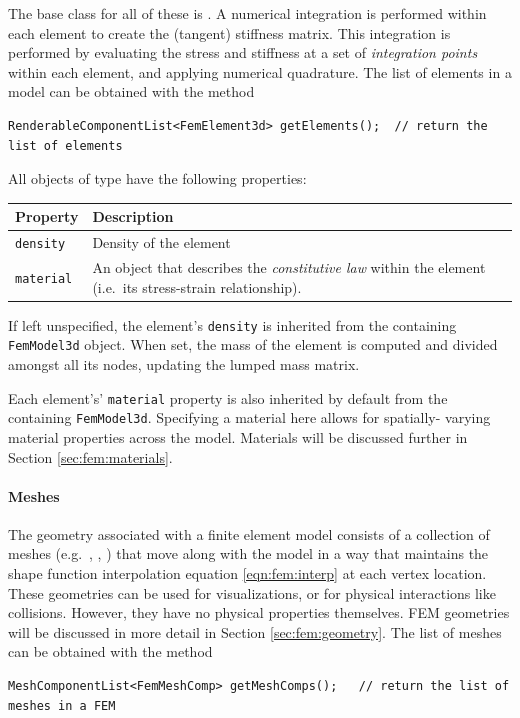 The base class for all of these is .  A numerical integration is performed within each element
to create the (tangent) stiffness matrix.  This integration is performed
by evaluating the stress and stiffness at a set of \emph{integration points}
within each element, and applying numerical quadrature.  The list of elements
in a model can be obtained with the method
\begin{lstlisting}[]
RenderableComponentList<FemElement3d> getElements();  // return the list of elements
\end{lstlisting}

All objects of type  have the 
following properties:
\begin{center}
	\begin{tabular}{|ll|}
		\hline
		Property & Description\\
		\hline
		{\tt density} & Density of the element\\
		{\tt material} & An object that describes the \emph{constitutive law} 
		                 within the element (i.e.~its stress-strain 
		                 relationship).\\
		\hline
	\end{tabular}
\end{center}

If left unspecified, the element's {\tt density} is inherited from the 
containing {\tt FemModel3d} object.  When set, the mass of the element is
computed and divided amongst all its nodes, updating the lumped mass
matrix.

Each element's' {\tt material} property is also inherited by default from the 
containing {\tt FemModel3d}. Specifying a material here allows for spatially-%
varying material properties across the model.  Materials will be discussed
further in Section \ref{sec:fem:materials}.

\paragraph{Meshes}
\ifLaTeXML{\newline}

The geometry associated with a finite element model consists of a collection
of meshes (e.g.~, ,
) that move along with the
model in a way that maintains the shape function interpolation equation 
\eqref{eqn:fem:interp}
at each vertex location.  These geometries can be used for visualizations, or 
for physical interactions like collisions.  However, they have no physical 
properties themselves. FEM geometries will be discussed in more detail in 
Section \ref{sec:fem:geometry}.  The list of meshes can be obtained with the 
method
\begin{lstlisting}[]
MeshComponentList<FemMeshComp> getMeshComps();   // return the list of meshes in a FEM
\end{lstlisting}

